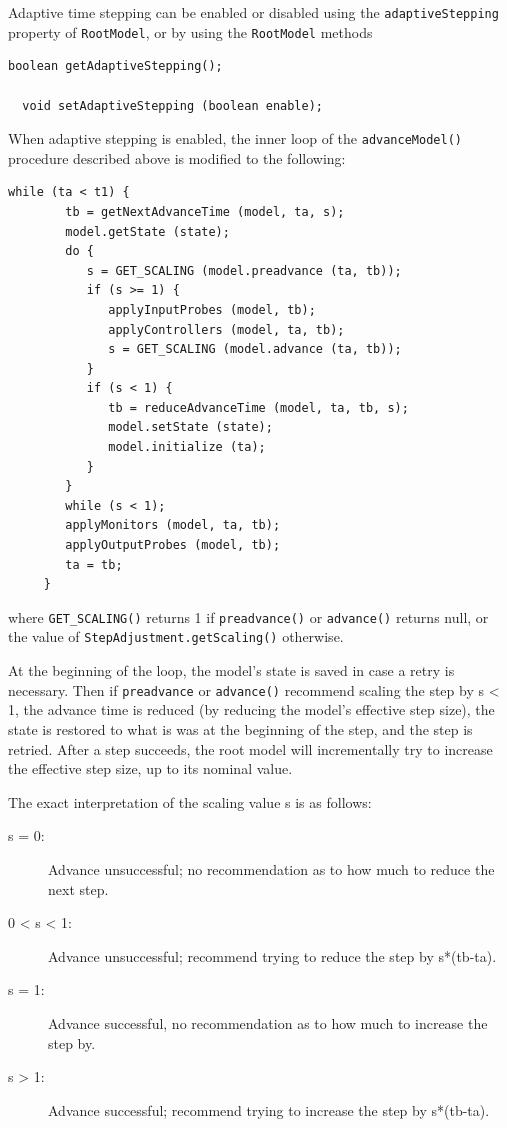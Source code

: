 \documentclass{article}
\begin{document}
Adaptive time stepping can be enabled or disabled using the {\tt adaptiveStepping}
property of {\tt RootModel}, or by using the {\tt RootModel} methods
\begin{lstlisting}[]
  boolean getAdaptiveStepping();

  void setAdaptiveStepping (boolean enable);
\end{lstlisting}

When adaptive stepping is enabled, the inner loop of the
{\tt advanceModel()} procedure described above is modified to the following:
\begin{lstlisting}[]
     while (ta < t1) {
        tb = getNextAdvanceTime (model, ta, s);
        model.getState (state);
        do {
           s = GET_SCALING (model.preadvance (ta, tb));
           if (s >= 1) {
              applyInputProbes (model, tb);
              applyControllers (model, ta, tb);
              s = GET_SCALING (model.advance (ta, tb));
           }
           if (s < 1) {
              tb = reduceAdvanceTime (model, ta, tb, s);
              model.setState (state);
              model.initialize (ta);
           }
        }
        while (s < 1);
        applyMonitors (model, ta, tb);
        applyOutputProbes (model, tb);
        ta = tb;
     }
\end{lstlisting}
where {\tt GET\_SCALING()} returns 1 if {\tt preadvance()} or
{\tt advance()} returns null, or the value of 
{\tt StepAdjustment.getScaling()} otherwise.

At the beginning of the loop, the model's state is saved in case a
retry is necessary. Then if {\tt preadvance{}} or {\tt advance()} recommend
scaling the step by s < 1, the advance time is
reduced (by reducing the model's effective step size), the state is
restored to what is was at the beginning of the step, and the step is
retried. After a step succeeds, the root model will
incrementally try to increase the effective step size, up to its
nominal value.

The exact interpretation of the scaling value s is
as follows:

\begin{description}
\item[s = 0:]
Advance unsuccessful; no recommendation as to how much to reduce the 
next step.

\item[0 < s < 1:]
Advance unsuccessful; recommend trying to reduce the step by s*(tb-ta).

\item[s = 1:]
Advance successful, no recommendation as to how much to increase the step by.

\item[s > 1:]
Advance successful; recommend trying to increase the step by s*(tb-ta).
\end{description}
\end{document}
